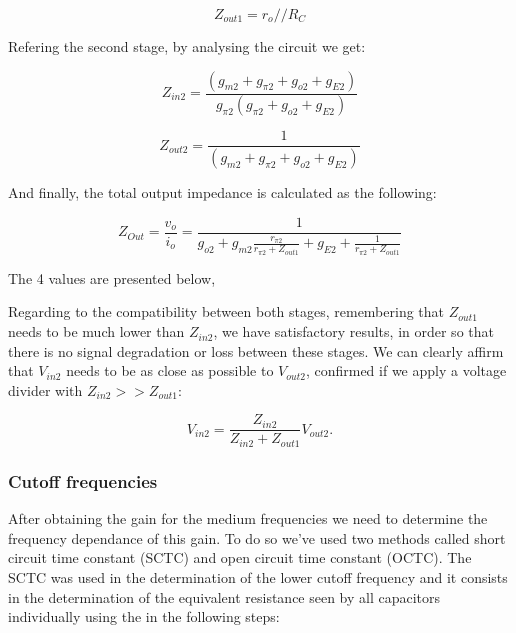 \begin{equation}
Z_{out1} = {r_o}//{R_{C}}
\label{eq3}
\end{equation} 

Refering the second stage, by analysing the circuit we get:

\begin{equation}
    Z_{in2}=\frac{(g_{m2}+g_{\pi2}+g_{o2}+g_{E2})}{g_{\pi2}(g_{\pi2}+g_{o2}+g_{E2})}
\end{equation}

\begin{equation}
    Z_{out2}=\frac{1}{(g_{m2}+g_{\pi2}+g_{o2}+g_{E2})}
\end{equation}

And finally, the total output impedance is calculated as the following:

\begin{equation}
    Z_{Out}=\frac{v_o}{i_o}=\frac{1}{g_{o2}+g_{m2}\frac{r_{\pi2}}{r_{\pi2}+Z_{out1}}+g_{E2}+\frac{1}{r_{\pi2}+Z_{out1}}}
\end{equation}

The 4 values are presented below,

%

Regarding to the compatibility between both stages, remembering that $Z_{out1}$ needs to be  much lower than $Z_{in2}$, we have satisfactory results, in order so that there is no signal degradation or loss between these stages. We can clearly affirm that $V_{in2}$ needs to be as close as possible to $V_{out2}$, confirmed if we apply a voltage divider with $Z_{in2}>>Z_{out1}$:

\begin{equation}
    V_{in2} = \frac{Z_{in2}}{Z_{in2}+Z_{out1}} V_{out2}. 
\end{equation}

\subsubsection{Cutoff frequencies}

After obtaining the gain for the medium frequencies we need to determine the frequency dependance of this gain. To do so we've used two methods called short circuit time constant (SCTC) and open circuit time constant (OCTC). The SCTC was used in the determination of the lower cutoff frequency and it consists in the determination of the equivalent resistance seen by all capacitors individually using the in the following steps:


